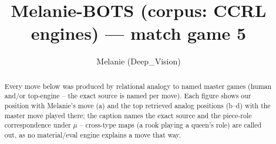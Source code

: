 \documentclass[11pt]{article}
\title{Melanie-BOTS (corpus: CCRL engines) — match game 5}
\author{Melanie (Deep\_Vision)}
\date{}
\begin{document}
\maketitle

\begin{abstract}Every move below was produced by relational analogy to named master games (human and/or top-engine -- the exact source is named per move). Each figure shows our position with Melanie's move (a) and the top retrieved analog positions (b--d) with the master move played there; the caption names the exact source and the piece-role correspondence under $\mu$ -- cross-type maps (a rook playing a queen's role) are called out, as no material/eval engine explains a move that way.\end{abstract}

\begin{figure}[p]\centering
\begin{subfigure}{0.46\textwidth}\centering
\resizebox{\linewidth}{!}{%
\newchessgame
\chessboard[
  setfen={r1bq1rk1/pppp1ppp/3n1b2/8/8/2N5/PPPP1PPP/R1BQRBK1 b - - 4 10},
  showmover=false,
  pgfstyle=straightmove, color=movearrow, markmove={g7-g6}
]}
\caption{}
\end{subfigure}\hfill
\begin{subfigure}{0.46\textwidth}\centering
\resizebox{\linewidth}{!}{%
\newchessgame
\chessboard[
  setfen={rnbqkb1r/ppp1pp1p/6p1/3n4/3P4/2N5/PP2PPPP/R1BQKBNR w KQkq - 0 5},
  showmover=false,
  pgfstyle=straightmove, color=movearrow, markmove={c1-d2}
]}
\caption{}
\end{subfigure}
\\[4pt]
\begin{subfigure}{0.46\textwidth}\centering
\resizebox{\linewidth}{!}{%
\newchessgame
\chessboard[
  setfen={rnbqkb1r/ppp1pp1p/6p1/3n4/3P4/2N5/PP2PPPP/R1BQKBNR w KQkq - 0 5},
  showmover=false,
  pgfstyle=straightmove, color=movearrow, markmove={c1-d2}
]}
\caption{}
\end{subfigure}\hfill
\begin{subfigure}{0.46\textwidth}\centering
\resizebox{\linewidth}{!}{%
\newchessgame
\chessboard[
  setfen={rnbqkb1r/ppp1pp1p/6p1/3n4/3P4/2N5/PP2PPPP/R1BQKBNR w KQkq - 0 5},
  showmover=false,
  pgfstyle=straightmove, color=movearrow, markmove={c1-d2}
]}
\caption{}
\end{subfigure}

\end{figure}
\end{document}
